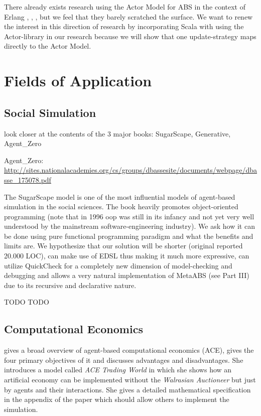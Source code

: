There already exists research using the Actor Model \cite{agha_actors:_1986} for ABS in the context of Erlang \cite{varela_modelling_2004}, \cite{di_stefano_using_2005}, \cite{di_stefano_exat:_2007}, \cite{sher_agent-based_2013} but we feel that they barely scratched the surface. We want to renew the interest in this direction of research by incorporating Scala with using the Actor-library in our research because we will show that one update-strategy maps directly to the Actor Model.

\section{Fields of Application}
\subsection{Social Simulation}
 look closer at the contents of the 3 major books: SugarScape, Generative, Agent\_Zero

Agent\_Zero: \url{http://sites.nationalacademies.org/cs/groups/dbassesite/documents/webpage/dbasse_175078.pdf}


The SugarScape model \cite{epstein_growing_1996} is one of the most influential models of agent-based simulation in the social sciences. The book heavily promotes object-oriented programming (note that in 1996 oop was still in its infancy and not yet very well understood by the mainstream software-engineering industry). We ask how it can be done using pure functional programming paradigm and what the benefits and limits are. We hypothesize that our solution will be shorter (original reported 20.000 LOC), can make use of EDSL thus making it much more expressive, can utilize QuickCheck for a completely new dimension of model-checking and debugging and allows a very natural implementation of MetaABS (see Part III) due to its recursive and declarative nature.

TODO \cite{huberman_evolutionary_1993} 
TODO \cite{nowak_evolutionary_1992}
\subsection{Computational Economics}
\cite{tesfatsion_agent-based_2006} gives a broad overview of agent-based computational economics (ACE), gives the four primary objectives of it and discusses advantages and disadvantages. She introduces a model called \textit{ACE Trading World} in which she shows how an artificial economy can be implemented without the \textit{Walrasian Auctioneer} but just by agents and their interactions. She gives a detailed mathematical specification in the appendix of the paper which should allow others to implement the simulation.

